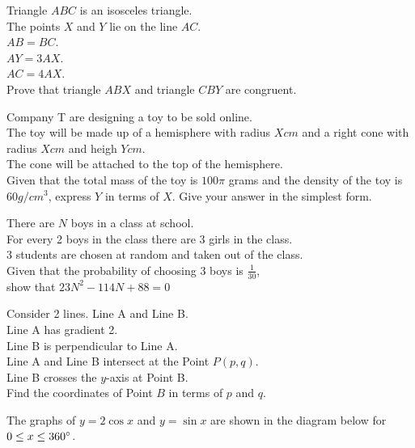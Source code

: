 \documentclass{exam}
\newenvironment{nscenter}
 {\parskip=0pt\par\nopagebreak\centering}
 {\par\noindent\ignorespacesafterend}
\begin{document}
\begin{questions}
    \question Triangle $ABC$ is an isosceles triangle.\\
    The points $X$ and $Y$ lie on the line $AC$.\\
    $AB=BC$.\\
    $AY=3AX$.\\
    $AC=4AX$.\\
    Prove that triangle $ABX$ and triangle $CBY$ are congruent.
    \newpage

    \question Company T are designing a toy to be sold online.\\
    The toy will be made up of a hemisphere with radius $Xcm$ and a right cone with radius $Xcm$ and heigh $Ycm$.\\
    The cone will be attached to the top of the hemisphere.\\

    Given that the total mass of the toy is $100\pi$ grams and the density of the toy is $60g/cm^3$, express $Y$ in terms of $X$. Give your answer in the simplest form.
    \newpage

    \question There are $N$ boys in a class at school.\\
    For every 2 boys in the class there are 3 girls in the class.\\
    3 students are chosen at random and taken out of the class.\\

    Given that the probability of choosing 3 boys is $\frac{1}{30}$, \\show that $23N^2-114N+88=0$
    \newpage

    \question Consider 2 lines. Line A and Line B.\\
    Line A has gradient 2.\\
    Line B is perpendicular to Line A.\\
    Line A and Line B intersect at the Point $P(p,q)$.\\
    Line B crosses the $y$-axis at Point B.\\

    Find the coordinates of Point $B$ in terms of $p$ and $q$.
    \newpage

    \question The graphs of $y=2\cos{x}$ and $y=\sin{x}$ are shown in the diagram below for $0\leq x\leq 360\degree$.\\
    \begin{nscenter}
\end{nscenter}
\end{questions}
\end{document}
